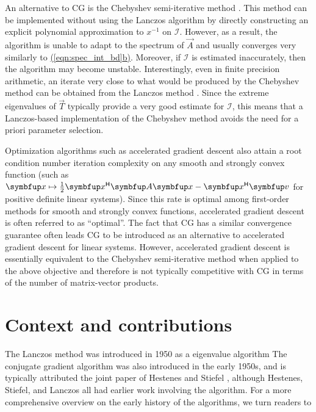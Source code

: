 An alternative to CG is the Chebyshev semi-iterative method \cite{glanders_shortley_50,gutknecht_rollin_02}.
This method can be implemented without using the Lanczos algorithm by directly constructing an explicit polynomial approximation to \( x^{-1} \) on \( \mathcal{I} \). 
However, as a result, the algorithm is unable to adapt to the spectrum of \( \vec{A} \) and usually converges very similarly to \href{eqn:spec_int_bd}{(\ref{eqn:spec_int_bd}b)}.
Moreover, if \( \mathcal{I} \) is estimated inaccurately, then the algorithm may become unstable. 
Interestingly, even in finite precision arithmetic, an iterate very close to what would be produced by the Chebyshev method can be obtained from the Lanczos method \cite{greenbaum_89,druskin_knizhnerman_91,musco_musco_sidford_18}.
Since the extreme eigenvalues of \( \vec{T} \) typically provide a very good estimate for \( \mathcal{I} \), this means that a Lanczos-based implementation of the Chebyshev method avoids the need for a priori parameter selection.

\begin{remark}
    Optimization algorithms such as accelerated gradient descent also attain a root condition number iteration complexity on any smooth and strongly convex function (such as \( \vec{x} \mapsto \frac{1}{2} \vec{x}^\cT \vec{A} \vec{x} - \vec{x}^\cT \vec{v} \) for positive definite linear systems).
Since this rate is optimal among first-order methods for smooth and strongly convex functions, accelerated gradient descent is often referred to as ``optimal''.
The fact that CG has a similar convergence guarantee often leads CG to be introduced as an alternative to accelerated gradient descent for linear systems.
However, accelerated gradient descent is essentially equivalent to the Chebyshev semi-iterative method when applied to the above objective and therefore is not typically competitive with CG in terms of the number of matrix-vector products.
\end{remark}


\section{Context and contributions}
\iffalse
The Lanczos method was introduced in 1950 as a eigenvalue algorithm \cite{lanczos_50}
The conjugate gradient algorithm was also introduced in the early 1950s, and is typically attributed the joint paper of Hestenes and Stiefel \cite{hestenes_stiefel_52}, although Hestenes, Stiefel, and Lanczos \cite{lanczos_50,lanczos_52} all had earlier work involving the algorithm.
For a more comprehensive overview on the early history of the algorithms, we turn readers to \cite{golub_oleary_89}


